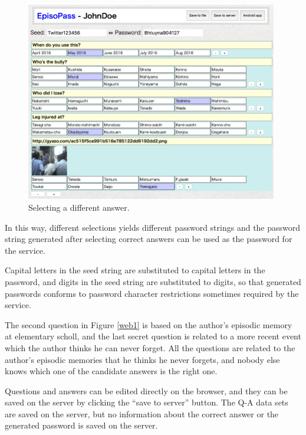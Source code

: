 \documentclass{article}
\begin{document}
\begin{figure}[H]
\includegraphics[width=110mm,bb=-30 0 803 660]{figures/01e5507d090eb494a20bcbc47c86b1d2.png}
\caption{Selecting a different answer.}
\label{web11}
\end{figure}

In this way, different selections yields different password strings and
the password string generated after selecting correct answers can be
used as the password for the service.

Capital letters in the seed string are substituted to capital letters in the password,
and digits in the seed string are substituted to digits,
so that generated passwords conforms to password character restrictions
sometimes required by the service.


The second question in Figure \ref{web1}
is based on the author's episodic memory at elementary scholl,
and the last secret question is related to a more recent event
which the author thinks he can never forget.
All the questions are related to the author's episodic memories
that he thinks he never forgets, and nobody else knows which one of the
candidate answers is the right one.

Questions and answers can be edited directly on the browser, and they can be
saved on the server by clicking the ``save to server'' button.
The Q-A data sets are saved on the server,
but no information about the correct answer or the
generated password is saved on the server.
\end{document}
